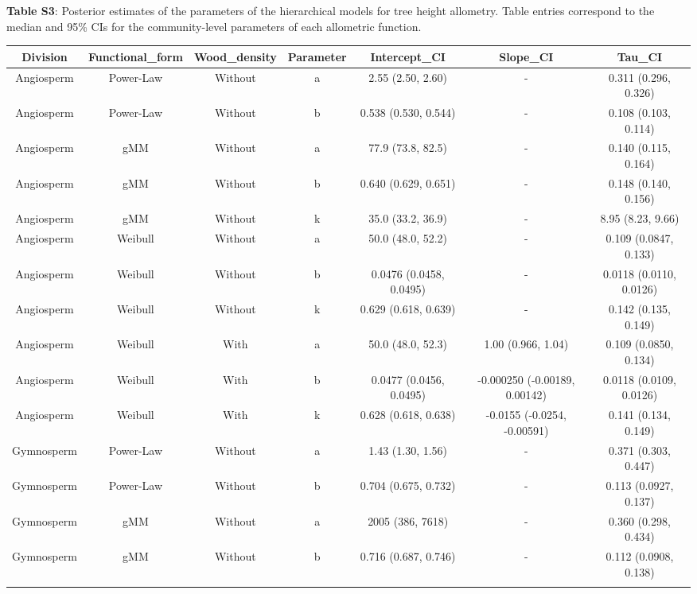 \documentclass[
  12pt,
  letterpaper,
  DIV=11,
  numbers=noendperiod]{scrartcl}
\begin{document}
\newpage

\textbf{Table S3}: Posterior estimates of the parameters of the
hierarchical models for tree height allometry. Table entries correspond
to the median and 95\% CIs for the community-level parameters of each
allometric function.

\begingroup\fontsize{10}{12}\selectfont

\begin{longtable*}[t]{ccccccc}
\toprule
Division & Functional\_form & Wood\_density & Parameter & Intercept\_CI & Slope\_CI & Tau\_CI\\
\midrule
Angiosperm & Power-Law & Without & a & 2.55 (2.50, 2.60) & - & 0.311 (0.296, 0.326)\\
Angiosperm & Power-Law & Without & b & 0.538 (0.530, 0.544) & - & 0.108 (0.103, 0.114)\\
Angiosperm & gMM & Without & a & 77.9 (73.8, 82.5) & - & 0.140 (0.115, 0.164)\\
Angiosperm & gMM & Without & b & 0.640 (0.629, 0.651) & - & 0.148 (0.140, 0.156)\\
Angiosperm & gMM & Without & k & 35.0 (33.2, 36.9) & - & 8.95 (8.23, 9.66)\\
\addlinespace
Angiosperm & Weibull & Without & a & 50.0 (48.0, 52.2) & - & 0.109 (0.0847, 0.133)\\
Angiosperm & Weibull & Without & b & 0.0476 (0.0458, 0.0495) & - & 0.0118 (0.0110, 0.0126)\\
Angiosperm & Weibull & Without & k & 0.629 (0.618, 0.639) & - & 0.142 (0.135, 0.149)\\
Angiosperm & Weibull & With & a & 50.0 (48.0, 52.3) & 1.00 (0.966, 1.04) & 0.109 (0.0850, 0.134)\\
Angiosperm & Weibull & With & b & 0.0477 (0.0456, 0.0495) & -0.000250 (-0.00189, 0.00142) & 0.0118 (0.0109, 0.0126)\\
\addlinespace
Angiosperm & Weibull & With & k & 0.628 (0.618, 0.638) & -0.0155 (-0.0254, -0.00591) & 0.141 (0.134, 0.149)\\
Gymnosperm & Power-Law & Without & a & 1.43 (1.30, 1.56) & - & 0.371 (0.303, 0.447)\\
Gymnosperm & Power-Law & Without & b & 0.704 (0.675, 0.732) & - & 0.113 (0.0927, 0.137)\\
Gymnosperm & gMM & Without & a & 2005 (386, 7618) & - & 0.360 (0.298, 0.434)\\
Gymnosperm & gMM & Without & b & 0.716 (0.687, 0.746) & - & 0.112 (0.0908, 0.138)\\
\addlinespace

\end{longtable*}
\end{document}
